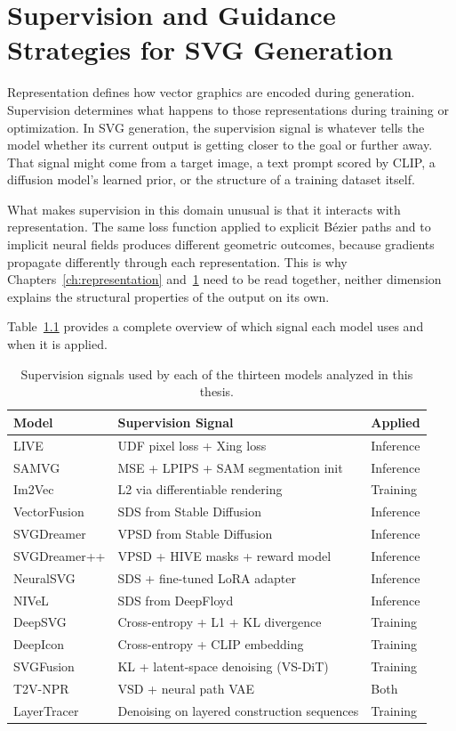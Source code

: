 \chapter{Supervision and Guidance Strategies for SVG Generation}
\label{ch:supervision}

Representation defines how vector graphics are encoded during generation. 
Supervision determines what happens to those representations during training or optimization.
In SVG generation, the supervision signal is whatever tells the model whether its current output 
is getting closer to the goal or further away. That signal might come from a target image, 
a text prompt scored by CLIP, a diffusion model's learned prior, or the structure of a training dataset itself.

What makes supervision in this domain unusual is that it interacts with representation. 
The same loss function applied to explicit B\'{e}zier paths and to implicit neural fields 
produces different geometric outcomes, because gradients propagate differently through each representation. 
This is why Chapters~\ref{ch:representation} and~\ref{ch:supervision} need to be read together, 
neither dimension explains the structural properties of the output on its own.

Table~\ref{tab:supervision_overview} provides a complete overview of which signal each model uses and when it is applied.

\begin{table}[htbp]
\centering
\caption{Supervision signals used by each of the thirteen models 
analyzed in this thesis.}
\label{tab:supervision_overview}
\begin{tabular}{l l l}
\hline
\textbf{Model} & \textbf{Supervision Signal} & \textbf{Applied} \\
\hline
LIVE & UDF pixel loss + Xing loss & Inference \\
SAMVG & MSE + LPIPS + SAM segmentation init & Inference \\
Im2Vec & L2 via differentiable rendering & Training \\
VectorFusion & SDS from Stable Diffusion & Inference \\
SVGDreamer & VPSD from Stable Diffusion & Inference \\
SVGDreamer++ & VPSD + HIVE masks + reward model & Inference \\
NeuralSVG & SDS + fine-tuned LoRA adapter & Inference \\
NIVeL & SDS from DeepFloyd & Inference \\
DeepSVG & Cross-entropy + L1 + KL divergence & Training \\
DeepIcon & Cross-entropy + CLIP embedding & Training \\
SVGFusion & KL + latent-space denoising (VS-DiT) & Training \\
T2V-NPR & VSD + neural path VAE & Both \\
LayerTracer & Denoising on layered construction sequences & Training \\
\hline
\end{tabular}
\end{table}


